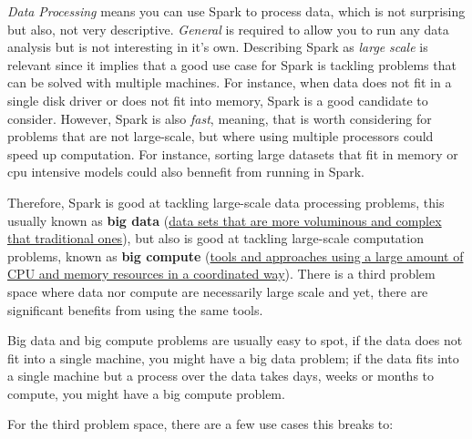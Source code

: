 \documentclass[]{book}
\theoremstyle{definition}
\theoremstyle{definition}
\theoremstyle{definition}
\theoremstyle{remark}
\begin{document}
\emph{Data} \emph{Processing} means you can use Spark to process data,
which is not surprising but also, not very descriptive. \emph{General}
is required to allow you to run any data analysis but is not interesting
in it's own. Describing Spark as \emph{large} \emph{scale} is relevant
since it implies that a good use case for Spark is tackling problems
that can be solved with multiple machines. For instance, when data does
not fit in a single disk driver or does not fit into memory, Spark is a
good candidate to consider. However, Spark is also \emph{fast}, meaning,
that is worth considering for problems that are not large-scale, but
where using multiple processors could speed up computation. For
instance, sorting large datasets that fit in memory or cpu intensive
models could also bennefit from running in Spark.

Therefore, Spark is good at tackling large-scale data processing
problems, this usually known as \textbf{big data}
(\href{https://en.wikipedia.org/wiki/big_data}{data sets that are more
voluminous and complex that traditional ones}), but also is good at
tackling large-scale computation problems, known as \textbf{big compute}
(\href{https://www.nimbix.net/glossary/big-compute/}{tools and
approaches using a large amount of CPU and memory resources in a
coordinated way}). There is a third problem space where data nor compute
are necessarily large scale and yet, there are significant benefits from
using the same tools.

Big data and big compute problems are usually easy to spot, if the data
does not fit into a single machine, you might have a big data problem;
if the data fits into a single machine but a process over the data takes
days, weeks or months to compute, you might have a big compute problem.

For the third problem space, there are a few use cases this breaks to:
\end{document}
